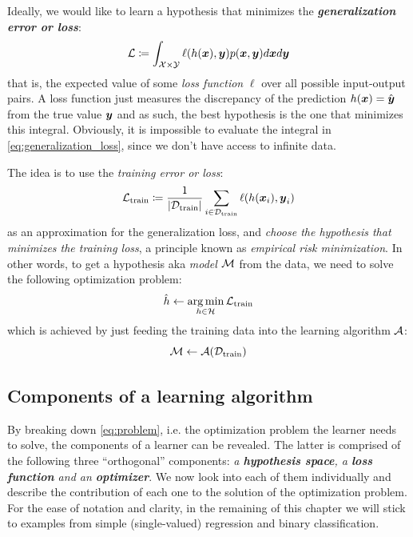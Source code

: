 Ideally, we would like to learn a hypothesis that minimizes the
\emph{\textbf{generalization error or loss}}:
\begin{equation}
	\label{eq:generalization_loss}
	\mathcal{L} \coloneqq
	\int_{\mathcal{X} \times \mathcal{Y}} \ell(h(\boldsymbol{x}), \boldsymbol{y}) p(\boldsymbol{x}, \boldsymbol{y}) d\boldsymbol{x} d\boldsymbol{y}
\end{equation}
that is, the expected value of some \emph{loss function}
$\ell$ over all possible input-output pairs. A loss function just measures the
discrepancy of the prediction $h(\boldsymbol{x}) = \hat{\boldsymbol{y}}$ from the true value $\boldsymbol{y}$
and as such, the best hypothesis is the one that minimizes this integral.
Obviously, it is impossible to evaluate the integral in \Equation{}
\ref{eq:generalization_loss}, since we don't have access to infinite data.

The idea is to use the \emph{training error or loss}:
\begin{equation}
	\label{eq:training_loss}
	\mathcal{L}_\text{train} \coloneqq \frac{1}{\lvert \mathcal{D}_\text{train} \rvert} \sum_{i \in \mathcal{D}_\text{train}}
	\ell(h(\boldsymbol{x}_i), \boldsymbol{y}_i)
\end{equation}
as an approximation for the generalization loss, and \emph{choose the hypothesis
that minimizes the training loss}, a principle known as \emph{empirical risk
minimization}. In other words, to get a
hypothesis aka \emph{model} $\mathcal{M}$ from the data, we need to
solve the following optimization problem:
\begin{equation}
	\label{eq:problem}
	\hat{h} \gets \operatorname*{arg\,min}_{h \in \mathcal{H}} \mathcal{L}_\text{train}
\end{equation}
which is achieved by just feeding the training data into the learning
algorithm $\mathcal{A}$:
\begin{equation}
	\label{eq:learner}
	\mathcal{M} \gets \mathcal{A}(\mathcal{D}_\text{train})
\end{equation}

\subsection{Components of a learning algorithm}

By breaking down \Equation{} \ref{eq:problem}, i.e. the optimization problem the
learner needs to solve, the components of a learner can be revealed. The latter
is comprised of the following three ``orthogonal'' components: \emph{a
\textbf{hypothesis space}, a \textbf{loss
function} and an \textbf{optimizer}}. We now look into each of them
individually and describe the contribution of each one to the solution of the
optimization problem. For the ease of notation and clarity, in the remaining of
this chapter we will stick to examples from simple (single-valued) regression
and binary classification.

